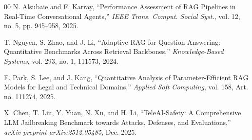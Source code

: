 \documentclass[conference]{IEEEtran}
\begin{document}
\begin{thebibliography}{00}
 N. Alsubaie and F. Karray, ``Performance Assessment of RAG Pipelines in Real-Time Conversational Agents,'' \textit{IEEE Trans. Comput. Social Syst.}, vol. 12, no. 5, pp. 945--958, 2025.

 T. Nguyen, S. Zhao, and J. Li, ``Adaptive RAG for Question Answering: Quantitative Benchmarks Across Retrieval Backbones,'' \textit{Knowledge-Based Systems}, vol. 293, no. 1, 111573, 2024.

 E. Park, S. Lee, and J. Kang, ``Quantitative Analysis of Parameter-Efficient RAG Models for Legal and Technical Domains,'' \textit{Applied Soft Computing}, vol. 158, Art. no. 111274, 2025.

 X. Chen, T. Liu, Y. Yuan, N. Xu, and H. Li, ``TeleAI-Safety: A Comprehensive LLM Jailbreaking Benchmark towards Attacks, Defenses, and Evaluations,'' \textit{arXiv preprint arXiv:2512.05485}, Dec. 2025.

\end{thebibliography}
\end{document}
